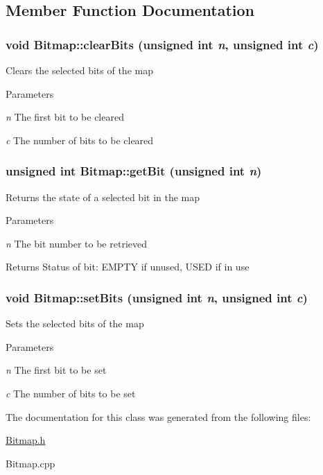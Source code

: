 \subsection{Member Function Documentation}
\hypertarget{classBitmap_ac81a92cbbdb42ced42dd649f6e8260df}{
\subsubsection[{clearBits}]{\setlength{\rightskip}{0pt plus 5cm}void Bitmap::clearBits (unsigned int {\em n}, \/  unsigned int {\em c})}}
\label{classBitmap_ac81a92cbbdb42ced42dd649f6e8260df}
Clears the selected bits of the map


\begin{DoxyParams}{Parameters}
\item[{\em n}]The first bit to be cleared \item[{\em c}]The number of bits to be cleared \end{DoxyParams}
\hypertarget{classBitmap_afcb1fce13a738274db91109b7afa86e7}{
\subsubsection[{getBit}]{\setlength{\rightskip}{0pt plus 5cm}unsigned int Bitmap::getBit (unsigned int {\em n})}}
\label{classBitmap_afcb1fce13a738274db91109b7afa86e7}
Returns the state of a selected bit in the map


\begin{DoxyParams}{Parameters}
\item[{\em n}]The bit number to be retrieved\end{DoxyParams}
\begin{DoxyReturn}{Returns}
Status of bit: EMPTY if unused, USED if in use 
\end{DoxyReturn}
\hypertarget{classBitmap_a499f1680d78307b7663e9671847dd87c}{
\subsubsection[{setBits}]{\setlength{\rightskip}{0pt plus 5cm}void Bitmap::setBits (unsigned int {\em n}, \/  unsigned int {\em c})}}
\label{classBitmap_a499f1680d78307b7663e9671847dd87c}
Sets the selected bits of the map


\begin{DoxyParams}{Parameters}
\item[{\em n}]The first bit to be set \item[{\em c}]The number of bits to be set \end{DoxyParams}


The documentation for this class was generated from the following files:\begin{DoxyCompactItemize}
\item 
\hyperlink{Bitmap_8h}{Bitmap.h}\item 
Bitmap.cpp\end{DoxyCompactItemize}
